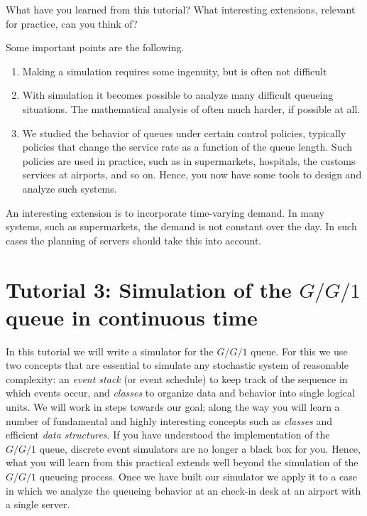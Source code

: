 \begin{exercise}
  What have you learned from this tutorial? What interesting extensions, relevant for practice,  can you think of?
  \begin{solution}
    Some important points are the following.
    \begin{enumerate}
    \item  Making a  simulation requires some ingenuity, but is often not difficult
    \item With simulation it becomes possible to analyze many difficult queueing situations. The mathematical analysis of often much harder, if possible at all.
    \item We studied the behavior of queues under certain control policies, typically policies that change the service rate as a function of the queue length. Such policies are used in practice, such as in supermarkets, hospitals, the customs services at airports, and so on. Hence, you now have some tools to design and analyze such systems. 
    \end{enumerate}

An interesting extension is to incorporate time-varying demand. In many systems, such as supermarkets, the demand is not constant over the day. In such cases the planning of servers should take this into account. 

  \end{solution}
\end{exercise}

\clearpage

\section{Tutorial 3: Simulation of the $G/G/1$ queue in continuous time}
\label{sec:simulation-gg1-queue}

In this tutorial we will write a simulator for the $G/G/1$ queue.
For this we use two concepts that are essential to simulate any stochastic system of reasonable complexity: an \emph{event stack} (or event schedule) to keep track of the sequence in which events occur, and \emph{classes} to organize data and behavior into single logical units.
We will work in steps towards our goal; along the way you will learn a number of fundamental and highly interesting concepts such as \emph{classes} and efficient \emph{data structures}.
If you have understood the implementation of the $G/G/1$ queue, discrete event simulators are no longer a black box for you.
Hence, what you will learn from this practical extends well beyond the simulation of the $G/G/1$ queueing process.
Once we have built our simulator we apply it to a case in which we analyze the queueing behavior at an check-in desk at an airport with a single server.

